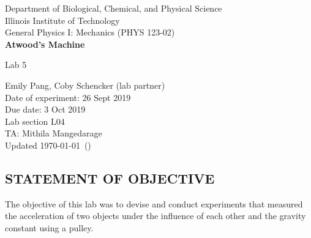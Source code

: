 \documentclass [12pt, letterpaper, twoside] {article}
\begin{document}
\begin {titlepage}
\begin {center}
Department of Biological, Chemical, and Physical Science\\
\vspace {0.1cm}
Illinois Institute of Technology\\
\vspace {0.1cm}
General Physics I: Mechanics (PHYS 123-02)\\
\vspace* {\fill}
\begingroup
\Large
\textbf {Atwood's Machine}
\vspace {0.35cm}

\normalsize
Lab 5
\vspace {1.5cm}
\endgroup
\vspace* {\fill}
\end {center}

\vspace*{\fill}
\begin {flushright}
\footnotesize
Emily Pang, Coby Schencker (lab partner)\\
Date of experiment: 26 Sept 2019\\
Due date: 3 Oct 2019\\
Lab section L04\\
TA: Mithila Mangedarage\\
Updated \usdate\today~(\currenttime)
\end {flushright}
\end {titlepage}
\pgfplotsset{compat=1.7}
\subsection* {STATEMENT OF OBJECTIVE}
The objective of this lab was to devise and conduct experiments that measured the acceleration of two objects under the influence of each other and the gravity constant using a pulley.
\end{document}
